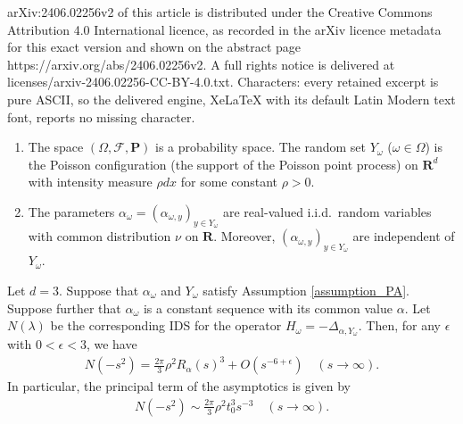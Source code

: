 \documentclass[10pt,a4paper]{amsart}
\begin{document}
arXiv:2406.02256v2 of this article is distributed under the Creative Commons Attribution 4.0 International licence, as recorded in the arXiv licence metadata for this exact version and shown on the abstract page https://arxiv.org/abs/2406.02256v2. A full rights notice is delivered at licenses/arxiv-2406.02256-CC-BY-4.0.txt. Characters: every retained excerpt is pure ASCII, so the delivered engine, XeLaTeX with its default Latin Modern text font, reports no missing character.
\begin{assumption}
\label{assumption_PA}
\begin{enumerate}
 \item 
The space $(\Omega,\mathcal{F},\mathbf{P})$ is a probability space.
The random set $Y_\omega$ ($\omega\in \Omega$) is the Poisson configuration
(the support of the Poisson point process) on $\mathbf{R}^d$
with intensity measure $\rho dx$ for some constant $\rho>0$.

 \item The parameters $\alpha_\omega=(\alpha_{\omega,y})_{y\in Y_\omega}$
are real-valued i.i.d.\ random variables
with common distribution $\nu$ on $\mathbf{R}$.
Moreover, $(\alpha_{\omega,y})_{y\in Y_\omega}$ 
are independent of $Y_\omega$.
\end{enumerate}
\end{assumption}

\begin{theorem}
 \label{theorem_asymptotics_IDS}
Let $d=3$.
Suppose that $\alpha_\omega$ and $Y_\omega$ satisfy
Assumption \ref{assumption_PA}.
Suppose further that
$\alpha_\omega$ is a constant sequence
with its common value $\alpha$.
Let $N(\lambda)$ be the corresponding IDS
for the operator $H_\omega=-\Delta_{\alpha,Y_\omega}$.
Then, for any $\epsilon$ with $0<\epsilon<3$,
we have
\begin{align}
\label{01_08}
N(-s^2)=\frac{2\pi}{3}\rho^2 R_\alpha(s)^3 + O(s^{-6+\epsilon})
\quad(s\to \infty).
\end{align}
In particular, the principal term of the asymptotics is given by
\begin{align}
\label{01_09}
 N(-s^2) \sim \frac{2\pi}{3}\rho^2 t_0^3s^{-3}\quad
(s\to\infty).
\end{align}
\end{theorem}
\end{document}
